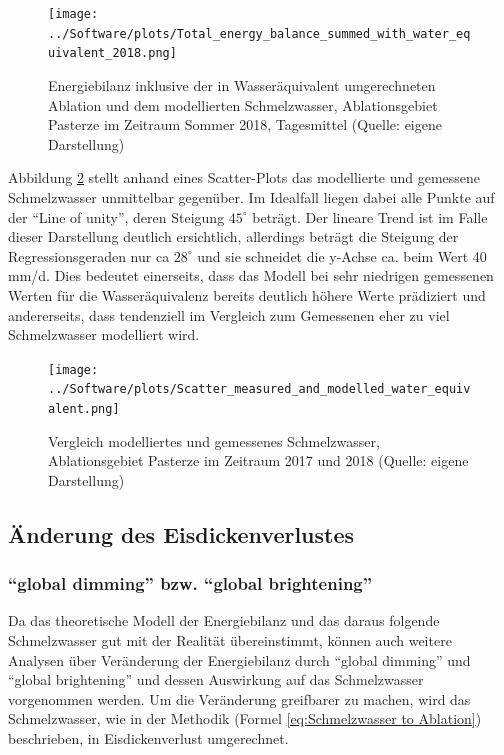 \documentclass[11pt,a4paper]{article}
\begin{document}
\begin{figure}[H]
\centering
\texttt{[image: ../Software/plots/Total\_energy\_balance\_summed\_with\_water\_equivalent\_2018.png]}
\caption[Energiebilanz inklusive der in Wasseräquivalent umgerechneten Ablation und dem modellierten Schmelzwasser, Ablationsgebiet Pasterze im Zeitraum Sommer 2018, Tagesmittel]{Energiebilanz inklusive der in Wasseräquivalent umgerechneten Ablation und dem modellierten Schmelzwasser, Ablationsgebiet Pasterze im Zeitraum Sommer 2018, Tagesmittel (Quelle: eigene Darstellung)}
\label{Energiebilanz im Sommer 2018 inklusive der in Wasseräquivalent umgerechneten Ablation und dem modellierten Schmelzwasser}
\end{figure}


Abbildung \ref{Vergleich modelliertes und gemessenes Schmelzwasser} stellt  anhand eines Scatter-Plots das modellierte und gemessene Schmelzwasser unmittelbar gegenüber. Im Idealfall liegen dabei alle Punkte auf der ``Line of unity'', deren Steigung $45^\circ$ beträgt. Der lineare Trend ist im Falle dieser Darstellung deutlich ersichtlich, allerdings beträgt die Steigung der Regressionsgeraden nur ca $28^\circ$ und sie schneidet die y-Achse ca. beim Wert 40 mm/d. Dies bedeutet einerseits, dass das Modell bei sehr niedrigen gemessenen Werten für die Wasseräquivalenz bereits deutlich höhere Werte prädiziert und andererseits, dass tendenziell im Vergleich zum Gemessenen eher zu viel Schmelzwasser modelliert wird.

\begin{figure}[H]
\centering
\texttt{[image: ../Software/plots/Scatter\_measured\_and\_modelled\_water\_equivalent.png]}
\caption[Vergleich modelliertes und gemessenes Schmelzwasser, Ablationsgebiet Pasterze im Zeitraum 2017 und 2018]{Vergleich modelliertes und gemessenes Schmelzwasser, Ablationsgebiet Pasterze im Zeitraum 2017 und 2018 (Quelle: eigene Darstellung)}
\label{Vergleich modelliertes und gemessenes Schmelzwasser}
\end{figure}



\subsection{Änderung des Eisdickenverlustes}
\subsubsection{``global dimming'' bzw. ``global brightening''}
Da das theoretische Modell der Energiebilanz und das daraus folgende Schmelzwasser gut mit der Realität übereinstimmt, können auch weitere Analysen über Veränderung der Energiebilanz durch ``global dimming'' und ``global brightening'' und dessen Auswirkung auf das Schmelzwasser vorgenommen werden. Um die Veränderung greifbarer zu machen, wird das Schmelzwasser, wie in der Methodik (Formel \ref{eq:Schmelzwasser to Ablation}) beschrieben, in Eisdickenverlust umgerechnet.\\
\end{document}
